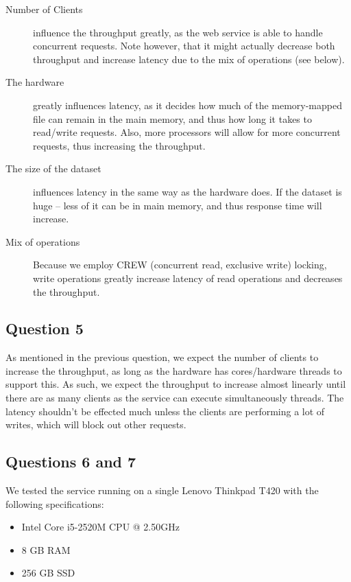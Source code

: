 \documentclass[a4paper,final]{article}
\begin{document}
\begin{description}
    \item [Number of Clients] influence the throughput greatly, as the web
        service is able to handle concurrent requests. Note however, that it
        might actually decrease both throughput and increase latency due to
        the mix of operations (see below).
    \item [The hardware] greatly influences latency, as it decides how much of
        the memory-mapped file can remain in the main memory, and thus how
        long it takes to read/write requests. Also, more processors will
        allow for more concurrent requests, thus increasing the throughput.
    \item [The size of the dataset] influences latency in the same way as the
        hardware does. If the dataset is huge -- less of it can be in main
        memory, and thus response time will increase.
    \item [Mix of operations] Because we employ CREW (concurrent read,
        exclusive write) locking, write operations greatly increase latency
        of read operations and decreases the throughput.
\end{description}


\subsection*{Question 5}
As mentioned in the previous question, we expect the number of clients to
increase the throughput, as long as the hardware has cores/hardware threads
to support this. As such, we expect the throughput to increase almost linearly
until there are as many clients as the service can execute simultaneously
threads. The latency shouldn't be effected much unless the clients are
performing a lot of writes, which will block out other requests.

\subsection*{Questions 6 and 7}

We tested the service running on a single Lenovo Thinkpad T420 with the
following specifications:

\begin{itemize}
    \item Intel Core i5-2520M CPU @ 2.50GHz
    \item 8 GB RAM
    \item 256 GB SSD
\end{itemize}
\end{document}
